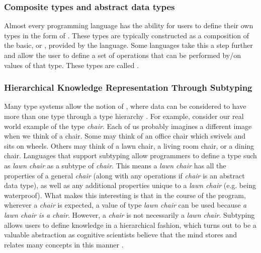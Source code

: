 \subsubsection{Composite types and abstract data types}
Almost every programming language has the ability for users to define their own types in the form of . These types are typically constructed as a composition of the basic, or , provided by the language. Some languages take this a step further and allow the user to define a set of operations that can be performed by/on values of that type. These types are called  \citep{sethi:proglang}.

\subsubsection{Hierarchical Knowledge Representation Through Subtyping}
Many type systems allow the notion of , where data can be considered to have more than one type through a type hierarchy \citep{pierce:types}. For example, consider our real world example of the type \textit{chair}. Each of us probably imagines a different image when we think of a chair. Some may think of an office chair which swivels and sits on wheels. Others may think of a lawn chair, a living room chair, or a dining chair. Languages that support subtyping allow programmers to define a type such as \textit{lawn chair} as a subtype of \textit{chair}. This means a \textit{lawn chair} has all the properties of a general \textit{chair} (along with any operations if \textit{chair} is an abstract data type), as well as any additional properties unique to a \textit{lawn chair} (e.g. being waterproof). What makes this interesting is that in the course of the program, wherever a \textit{chair} is expected, a value of type \textit{lawn chair} can be used because \textit{a lawn chair is a chair}. However, a \textit{chair} is not necessarily a \textit{lawn chair}. Subtyping allows users to define knowledge in a hierarchical fashion, which turns out to be a valuable abstraction as cognitive scientists believe that the mind stores and relates many concepts in this manner \citep{minksy:societyofmind}.

